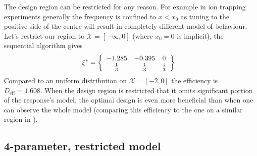 \documentclass[12pt]{iopart}
\begin{document}
The design region can be restricted for any reason. For example in ion trapping experiments generally the frequency is confined to $x < x_0$ as tuning to the positive side of the centre will result in completely different model of behaviour. Let's restrict our region to $\mathcal{X} = [-\infty, 0]$ (where $x_0 = 0$ is implicit), the sequential algorithm gives
\begin{equation}
\xi^* = \left\{
  \begin{array}{c c c}
    -1.285 & -0.395 &  0 \\
     \frac{1}{3} & \frac{1}{3} & \frac{1}{3}\\
  \end{array} \right \}
\end{equation}
Compared to an uniform distribution on $\mathcal{X} = [-2,0]$ the efficiency is $D_\mathrm{eff} = 1.608$. When the design region is restricted that it omits significant portion of the response's model, the optimal design is even more beneficial than when one can observe the whole model (comparing this efficiency to the one on a similar region in ).

\subsection{4-parameter, restricted model}
\end{document}
